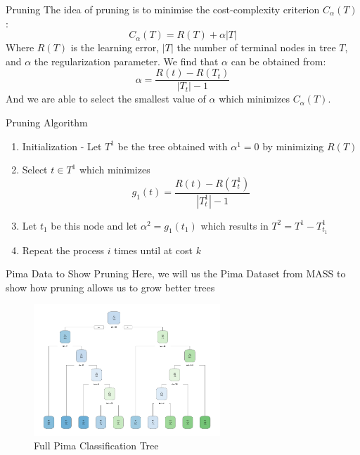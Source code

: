 \documentclass[12pt]{beamer}
\begin{document}
\begin{frame}{Pruning}
    The idea of pruning is to minimise the cost-complexity criterion $C_{\alpha} (T)$:
    \begin{equation}
        C_{\alpha} (T) = R(T) + \alpha \left|T\right|
    \end{equation}
    Where $R(T)$ is the learning error, $\left|T\right|$ the number of terminal nodes in tree $T$, and $\alpha$ the regularization parameter. We find that $\alpha$ can be obtained from:
    \[ \alpha = \frac{R(t)-R(T_t)}{|T_t| - 1} \]
    And we are able to select the smallest value of $\alpha$ which minimizes $C_{\alpha} (T)$.
\end{frame}

\begin{frame}{Pruning Algorithm}
\begin{enumerate}

    \item Initialization - Let $T^1$ be the tree obtained with $\alpha^1 = 0$ by minimizing $R(T)$
    
    \item Select $t \in T^1$ which minimizes
        \[ g_1 (t) = \frac{R(t)-R(T_t^1)}{|T_t^1| - 1} \]
    
    \item Let $t_1$ be this node and let $\alpha^2 = g_1 (t_1)$ which results in $T^2 = T^1 - T_{t_1}^1$
    
    \item Repeat the process $i$ times until at cost $k$

\end{enumerate}
\end{frame}

\begin{frame}{Pima Data to Show Pruning}
Here, we will us the Pima Dataset from MASS \cite{MASS} to show how pruning allows us to grow better trees
\begin{figure}
    \centering
    \includegraphics[width=7cm]{presentation/pimatrain.pdf}
    \caption{Full Pima Classification Tree}
    \label{fig:pima1}
\end{figure}
\end{frame}
\end{document}
